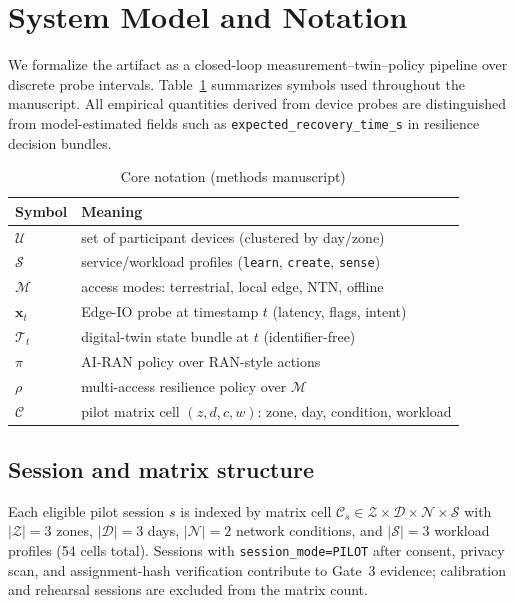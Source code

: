\section{System Model and Notation}
\label{sec:system_model}

We formalize the artifact as a closed-loop measurement--twin--policy pipeline over discrete probe intervals.
Table~\ref{tab:notation} summarizes symbols used throughout the manuscript.
All empirical quantities derived from device probes are distinguished from model-estimated fields such as \texttt{expected\_recovery\_time\_s} in resilience decision bundles.

\begin{table}[t]
\centering
\caption{Core notation (methods manuscript)}
\label{tab:notation}
\small
\begin{tabular}{ll}
\hline
\textbf{Symbol} & \textbf{Meaning} \\
\hline
$\mathcal{U}$ & set of participant devices (clustered by day/zone) \\
$\mathcal{S}$ & service/workload profiles (\texttt{learn}, \texttt{create}, \texttt{sense}) \\
$\mathcal{M}$ & access modes: terrestrial, local edge, NTN, offline \\
$\mathbf{x}_t$ & Edge-IO probe at timestamp $t$ (latency, flags, intent) \\
$\mathcal{T}_t$ & digital-twin state bundle at $t$ (identifier-free) \\
$\pi$ & AI-RAN policy over RAN-style actions \\
$\rho$ & multi-access resilience policy over $\mathcal{M}$ \\
$\mathcal{C}$ & pilot matrix cell $(z,d,c,w)$: zone, day, condition, workload \\
\hline
\end{tabular}
\end{table}

\subsection{Session and matrix structure}
Each eligible pilot session $s$ is indexed by matrix cell $\mathcal{C}_s \in \mathcal{Z}\times\mathcal{D}\times\mathcal{N}\times\mathcal{S}$ with $|\mathcal{Z}|=3$ zones, $|\mathcal{D}|=3$ days, $|\mathcal{N}|=2$ network conditions, and $|\mathcal{S}|=3$ workload profiles (54 cells total).
Sessions with \texttt{session\_mode=PILOT} after consent, privacy scan, and assignment-hash verification contribute to Gate~3 evidence; calibration and rehearsal sessions are excluded from the matrix count.

